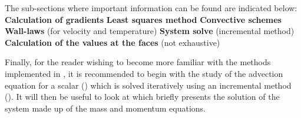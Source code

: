 The sub-sections where important information can be found are indicated
below:\newline
\newline
\nl \newline
\textbf{Calculation of gradients}\newline
\hspace*{1cm}\newline
\textbf{Least squares method}\newline
\hspace*{1cm}\newline
\textbf{Convective schemes}\newline
\hspace*{1cm}\newline
\textbf{Wall-laws} (for velocity and temperature)\newline
\hspace*{1cm}\newline
\hspace*{1cm}\newline
\textbf{System solve} (incremental method)\newline
\hspace*{1cm}\newline
\textbf{Calculation of the values at the faces} (not exhaustive)\newline
\hspace*{1cm}\newline

Finally, for the reader wishing to become more familiar with the methods
implemented in \CS, it is recommended to begin with the study of the
advection equation for a scalar () which is solved iteratively
using an incremental method (). It will then be useful to look
at  which briefly presents the solution of the system made up
of the mass and momentum equations.


